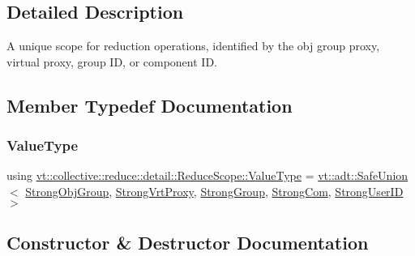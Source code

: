 \subsection{Detailed Description}
A unique scope for reduction operations, identified by the obj group proxy, virtual proxy, group ID, or component ID. 

\subsection{Member Typedef Documentation}
\mbox{\label{structvt_1_1collective_1_1reduce_1_1detail_1_1_reduce_scope_a7abcfd8ab86f38734725fe77455e4838}} 
\subsubsection{\texorpdfstring{Value\+Type}{ValueType}}
{\footnotesize\ttfamily using \hyperlink{structvt_1_1collective_1_1reduce_1_1detail_1_1_reduce_scope_a7abcfd8ab86f38734725fe77455e4838}{vt\+::collective\+::reduce\+::detail\+::\+Reduce\+Scope\+::\+Value\+Type} =  \hyperlink{namespacevt_1_1adt_ad2a7bbcb5f4735ae9d847f96ee62f144}{vt\+::adt\+::\+Safe\+Union}$<$ \hyperlink{namespacevt_1_1collective_1_1reduce_1_1detail_afd4940b3a4ac2ef740f0e3844a09dd08}{Strong\+Obj\+Group}, \hyperlink{namespacevt_1_1collective_1_1reduce_1_1detail_a492943cffff6d1a92386468d46f589df}{Strong\+Vrt\+Proxy}, \hyperlink{namespacevt_1_1collective_1_1reduce_1_1detail_adcad97800459415ff6ea4b5feb90e0f2}{Strong\+Group}, \hyperlink{namespacevt_1_1collective_1_1reduce_1_1detail_a6ea2d8e8f8ba226a6e704a9041aebaec}{Strong\+Com}, \hyperlink{namespacevt_1_1collective_1_1reduce_1_1detail_af9e42b20d1be7dccc1b5e587f0387e02}{Strong\+User\+ID} $>$}



\subsection{Constructor \& Destructor Documentation}
\mbox{\label{structvt_1_1collective_1_1reduce_1_1detail_1_1_reduce_scope_ac1da975b48590fd29147a12ef1be3e56}} 

